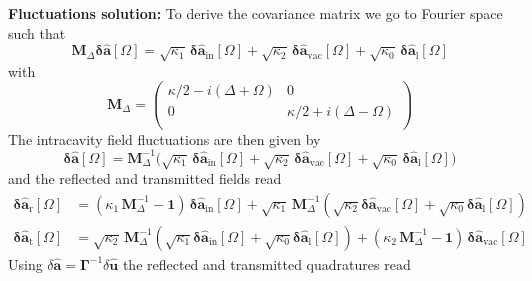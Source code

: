 \noindent \textbf{Fluctuations solution: }To derive the covariance matrix we go to Fourier space such that 
\begin{equation}
     \mathbf{M}_\Delta \mathbf{\delta \hat{a}}[\Omega]  = \sqrt{\kappa_{\mathrm{1}}} \, \mathbf{\delta \hat{a}_{\mathrm{in}}}[\Omega]  + \sqrt{\kappa_2} \, \mathbf{\delta \hat{a}_{\mathrm{vac}}}[\Omega]   + \sqrt{\kappa_0} \, \mathbf{\delta \hat{a}_{\mathrm{l}}}[\Omega]   
\end{equation}
with 
\begin{equation*}
  \mathbf{M}_\Delta =\begin{pmatrix}
  \kappa/2-i(\Delta+\Omega) & 0 \\ 
  0 & \kappa/2+i(\Delta-\Omega)\\ 
  \end{pmatrix} 
\end{equation*}
The intracavity field fluctuations are then given by
\begin{equation}
  \mathbf{\delta \hat{a}}[\Omega]  = \mathbf{M}^{-1}_\Delta \Big( \sqrt{\kappa_1} \, \mathbf{\delta \hat{a}_{\mathrm{in}}}[\Omega] +  \sqrt{\kappa_2} \, \mathbf{\delta \hat{a}_{\mathrm{vac}}}[\Omega] +  \sqrt{\kappa_0} \, \mathbf{\delta \hat{a}_{\mathrm{l}}}[\Omega] \Big)
\end{equation}
and the reflected and transmitted fields read
\begin{equation}
  \begin{split}
  \mathbf{\delta \hat{a}_{\mathrm{r}}}[\Omega]  &= ( \kappa_1 \, \mathbf{M}^{-1}_\Delta - \mathbf{1} )\, \mathbf{\delta \hat{a}_{\mathrm{in}}}[\Omega] +  \sqrt{\kappa_1} \,\mathbf{M}^{-1}_\Delta (\sqrt{\kappa_2} \mathbf{\delta \hat{a}_{\mathrm{vac}}}[\Omega] + \sqrt{\kappa_0}  \mathbf{\delta \hat{a}_{\mathrm{l}}}[\Omega] ) \\
  \mathbf{\delta \hat{a}_{\mathrm{t}}}[\Omega] & =  \sqrt{\kappa_2} \,\mathbf{M}^{-1}_\Delta (\sqrt{\kappa_1} \mathbf{\delta \hat{a}_{\mathrm{in}}}[\Omega] + \sqrt{\kappa_0}  \mathbf{\delta \hat{a}_{\mathrm{l}}}[\Omega] ) +  (\kappa_2 \,\mathbf{M}^{-1}_\Delta - \mathbf{1}) \, \mathbf{\delta \hat{a}_{\mathrm{vac}}}[\Omega] 
  \end{split}
\end{equation}
Using $\delta \hat{\mathbf{a}} = \mathbf \Gamma^{-1} \delta \hat{\mathbf{u}}$ the reflected and transmitted quadratures read
